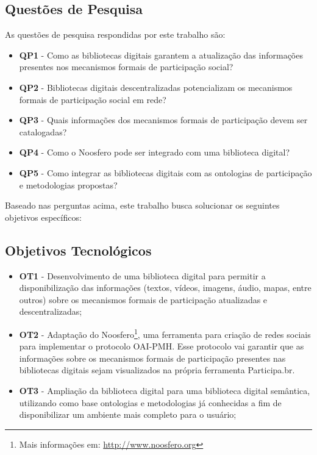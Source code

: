 \subsection{Questões de Pesquisa}

As questões de pesquisa respondidas por este trabalho são:

\begin{itemize}
\item \textbf{QP1} - Como as bibliotecas digitais garantem a atualização das informações presentes nos mecanismos formais de participação social?
\item \textbf{QP2} - Bibliotecas digitais descentralizadas potencializam os mecanismos formais de participação social em rede?
\item \textbf{QP3} - Quais informações dos mecanismos formais de participação devem ser catalogadas?
\item \textbf{QP4} - Como o Noosfero pode ser integrado com uma biblioteca digital?
\item \textbf{QP5} - Como integrar as bibliotecas digitais com as ontologias de participação e metodologias propostas?
\end{itemize} 

Baseado nas perguntas acima, este trabalho busca solucionar os seguintes objetivos específicos: 

\subsection*{Objetivos Tecnológicos}

\begin{itemize}
\item \textbf{OT1} - Desenvolvimento de uma biblioteca digital para permitir a disponibilização das informações (textos, vídeos, imagens, áudio, mapas, entre outros) sobre os mecanismos formais de participação atualizadas e descentralizadas;
\item \textbf{OT2} - Adaptação do Noosfero\footnote{Mais informações em: \url{http://www.noosfero.org}}, uma ferramenta para criação de redes sociais para implementar o protocolo OAI-PMH. Esse protocolo vai garantir que as informações sobre os mecanismos formais de participação presentes nas bibliotecas digitais sejam visualizados na própria ferramenta Participa.br.
\item \textbf{OT3} - Ampliação da biblioteca digital para uma biblioteca digital semântica, utilizando como base ontologias e metodologias já conhecidas a fim de disponibilizar um ambiente mais completo para o usuário;
\end{itemize}


